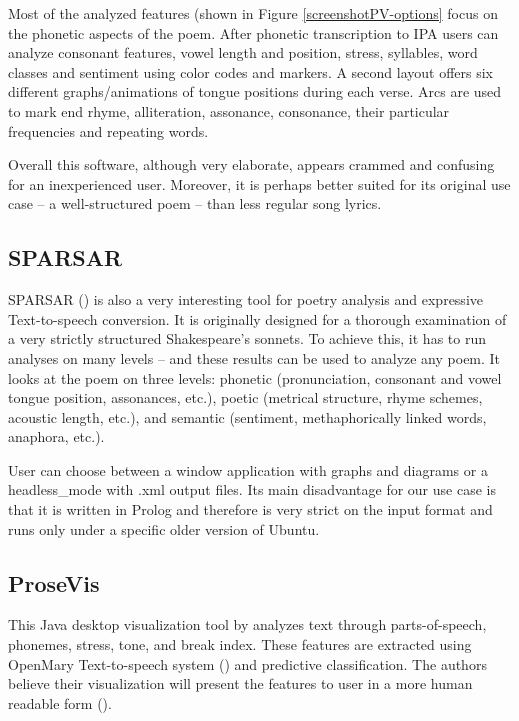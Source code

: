 Most of the analyzed features (shown in Figure \ref{screenshotPV-options} focus on the phonetic aspects of the poem. After phonetic transcription to IPA users can analyze consonant features, vowel length and position, stress, syllables, word classes and sentiment using color codes and markers. A second layout offers six different graphs/animations of tongue positions during each verse. Arcs are used to mark end rhyme, alliteration, assonance, consonance, their particular frequencies and repeating words.


Overall this software, although very elaborate, appears crammed and confusing for an inexperienced user. Moreover, it is perhaps better suited for its original use case -- a well-structured poem -- than less regular song lyrics.

\subsection{SPARSAR}
SPARSAR (\cite{Delmonte2014}) is also a very interesting tool for poetry analysis and expressive Text-to-speech conversion. It is originally designed for a thorough examination of a very strictly structured Shakespeare's sonnets. To achieve this, it has to run analyses on many levels -- and these results can be used to analyze any poem. It looks at the poem on three levels: phonetic (pronunciation, consonant and vowel tongue position, assonances, etc.), poetic (metrical structure, rhyme schemes, acoustic length, etc.), and semantic (sentiment, methaphorically linked words, anaphora, etc.).

User can choose between a window application with graphs and diagrams or a \gls{headless_mode} with .xml output files. Its main disadvantage for our use case is that it is written in Prolog and therefore is very strict on the input format and runs only under a specific older version of Ubuntu. 

\subsection{ProseVis}
This Java desktop visualization tool by \cite{Clement2013} analyzes text through
parts-of-speech, phonemes, stress, tone, and break index. These features are extracted using OpenMary Text-to-speech system (\cite{Schroder2006}) and predictive classification. The authors believe their visualization will present the features to user in a more human readable form (\cite{prosevis2017sourceforge}).

